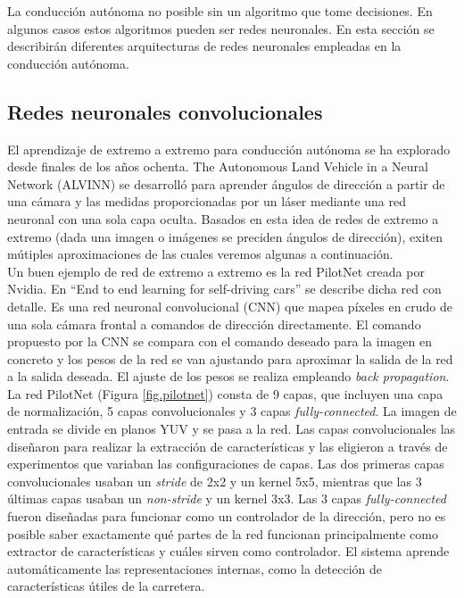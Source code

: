 La conducción autónoma no posible sin un algoritmo que tome decisiones. En algunos casos estos algoritmos pueden ser redes neuronales. En esta sección se describirán diferentes arquitecturas de redes neuronales empleadas en la conducción autónoma.


\subsection{Redes neuronales convolucionales}

El aprendizaje de extremo a extremo para conducción autónoma se ha explorado desde finales de los años ochenta. The Autonomous Land Vehicle in a Neural Network (ALVINN) \cite{alvinn} se desarrolló para aprender ángulos de dirección a partir de una cámara y las medidas proporcionadas por un láser mediante una red neuronal con una sola capa oculta. Basados en esta idea de redes de extremo a extremo (dada una imagen o imágenes se preciden ángulos de dirección), exiten mútiples aproximaciones \cite{road} \cite{end2end} \cite{interpretable} de las cuales veremos algunas a continuación.\\

Un buen ejemplo de red de extremo a extremo es la red PilotNet \cite{end2end} \cite{explaining-end2end} creada por Nvidia. En ``End to end learning for self-driving cars'' \cite{end2end} se describe dicha red con detalle. Es una red neuronal convolucional (CNN) que mapea píxeles en crudo de una sola cámara frontal a comandos de dirección directamente. El comando propuesto por la CNN se compara con el comando deseado para la imagen en concreto y los pesos de la red se van ajustando para aproximar la salida de la red a la salida deseada. El ajuste de los pesos se realiza empleando \textit{back propagation}.\\

La red PilotNet (Figura \ref{fig.pilotnet}) consta de 9 capas, que incluyen una capa de normalización, 5 capas convolucionales y 3 capas \textit{fully-connected}. La imagen de entrada se divide en planos YUV y se pasa a la red. Las capas convolucionales las diseñaron para realizar la extracción de características y las eligieron a través de experimentos que variaban las configuraciones de capas. Las dos primeras capas convolucionales usaban un \textit{stride} de 2x2 y un kernel 5x5, mientras que las 3 últimas capas usaban un \textit{non-stride} y un kernel 3x3. Las 3 capas \textit{fully-connected} fueron diseñadas para funcionar como un controlador de la dirección, pero no es posible saber exactamente qué partes de la red funcionan principalmente como extractor de características y cuáles sirven como controlador. El sistema aprende automáticamente las representaciones internas, como la detección de características útiles de la carretera.\\

